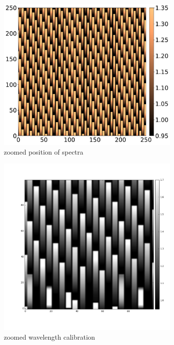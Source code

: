\documentclass[twoside,single]{lion-msc}
\begin{document}
\begin{figure}[hb]
\centering
\begin{subfigure}{.5\textwidth}
  \centering
  \includegraphics[width=1\linewidth]{specpos}
  \caption{zoomed position of spectra}
  \label{fig:specpos}
\end{subfigure}%
\begin{subfigure}{.5\textwidth}
  \centering
  \includegraphics[width=1\linewidth]{wavecal}
  \caption{zoomed wavelength calibration}
  \label{fig:wavecal}
\end{subfigure}
\caption{}
\end{figure}
\end{document}
